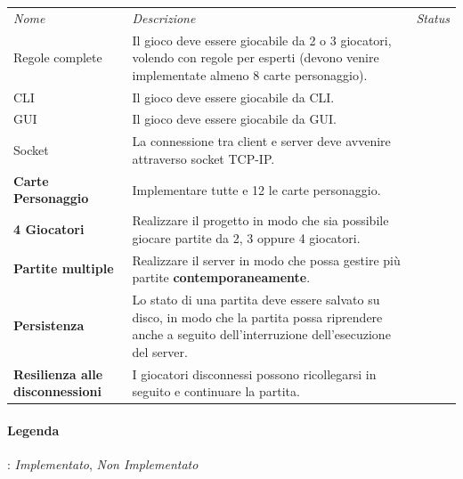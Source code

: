 \documentclass[a4paper, 12pt]{article}
\begin{document}
	\begin{center}
		\begin{tabular}{ |p{4cm}|p{10cm}|p{2cm}| }
			\hline
			\rowcolor[HTML]{edeef0} \multicolumn{3}{|c|}{\textbf{Funzionalità Implementate}} \\
			\hline
			\rowcolor[HTML]{edeef0}
			\textit{Nome}& \textit{Descrizione} & \textit{Status} \\
			\hline
			\rowcolor[HTML]{edeef0}
			Regole complete & Il gioco deve essere giocabile da 2 o 3 giocatori, volendo con regole per esperti (devono venire implementate almeno 8 carte personaggio). & \cellcolor[HTML]{ACEDAA} \\
			\rowcolor[HTML]{edeef0}
			CLI & Il gioco deve essere giocabile da CLI. & \cellcolor[HTML]{ACEDAA} \\
			\rowcolor[HTML]{edeef0}
			GUI   & Il gioco deve essere giocabile da GUI. & \cellcolor[HTML]{ACEDAA} \\
			\rowcolor[HTML]{edeef0}
			Socket  & La connessione tra client e server deve avvenire attraverso socket TCP-IP. & \cellcolor[HTML]{ACEDAA} \\
			\rowcolor[HTML]{edeef0}
			\textbf{Carte Personaggio} & Implementare tutte e 12 le carte personaggio. & \cellcolor[HTML]{ACEDAA} \\
			\rowcolor[HTML]{edeef0}
			\textbf{4 Giocatori} & Realizzare il progetto in modo che sia possibile giocare partite da 2, 3 oppure 4 giocatori. & \cellcolor[HTML]{ACEDAA}    \\
			\rowcolor[HTML]{edeef0}
			\textbf{Partite multiple} & Realizzare il server in modo che possa gestire più partite \textbf{contemporaneamente}. & \cellcolor[HTML]{ACEDAA} \\
			\rowcolor[HTML]{edeef0}
			\textbf{Persistenza} & Lo stato di una partita deve essere salvato su disco, in modo che la partita possa riprendere anche a seguito dell'interruzione dell'esecuzione del server. & \cellcolor[HTML]{edaaaa} \\
			\rowcolor[HTML]{edeef0}
			\textbf{Resilienza alle disconnessioni} & I giocatori disconnessi possono ricollegarsi in seguito e continuare la partita. & \cellcolor[HTML]{edaaaa} \\
			\hline
		\end{tabular}
	\end{center}
	\paragraph{Legenda}: \quad \textit{Implementato},  \quad \textit{Non Implementato}
\end{document}

